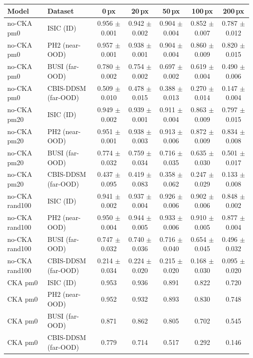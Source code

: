 \begin{tabular}{llccccc}
\toprule
Model & Dataset & 0\,px & 20\,px & 50\,px & 100\,px & 200\,px \\
\midrule
no-CKA pm0 & ISIC (ID) & 0.956 $\pm$ 0.001 & 0.942 $\pm$ 0.002 & 0.904 $\pm$ 0.004 & 0.852 $\pm$ 0.007 & 0.787 $\pm$ 0.012 \\
no-CKA pm0 & PH2 (near-OOD) & 0.957 $\pm$ 0.001 & 0.938 $\pm$ 0.001 & 0.904 $\pm$ 0.004 & 0.860 $\pm$ 0.009 & 0.820 $\pm$ 0.015 \\
no-CKA pm0 & BUSI (far-OOD) & 0.780 $\pm$ 0.002 & 0.754 $\pm$ 0.002 & 0.697 $\pm$ 0.002 & 0.619 $\pm$ 0.004 & 0.490 $\pm$ 0.006 \\
no-CKA pm0 & CBIS-DDSM (far-OOD) & 0.509 $\pm$ 0.010 & 0.478 $\pm$ 0.015 & 0.388 $\pm$ 0.013 & 0.270 $\pm$ 0.014 & 0.147 $\pm$ 0.004 \\
no-CKA pm20 & ISIC (ID) & 0.949 $\pm$ 0.002 & 0.939 $\pm$ 0.001 & 0.911 $\pm$ 0.004 & 0.863 $\pm$ 0.009 & 0.797 $\pm$ 0.015 \\
no-CKA pm20 & PH2 (near-OOD) & 0.951 $\pm$ 0.001 & 0.938 $\pm$ 0.003 & 0.913 $\pm$ 0.006 & 0.872 $\pm$ 0.009 & 0.834 $\pm$ 0.008 \\
no-CKA pm20 & BUSI (far-OOD) & 0.774 $\pm$ 0.032 & 0.759 $\pm$ 0.034 & 0.716 $\pm$ 0.035 & 0.635 $\pm$ 0.030 & 0.501 $\pm$ 0.017 \\
no-CKA pm20 & CBIS-DDSM (far-OOD) & 0.437 $\pm$ 0.095 & 0.419 $\pm$ 0.083 & 0.358 $\pm$ 0.062 & 0.247 $\pm$ 0.029 & 0.133 $\pm$ 0.008 \\
no-CKA rand100 & ISIC (ID) & 0.941 $\pm$ 0.002 & 0.937 $\pm$ 0.004 & 0.926 $\pm$ 0.006 & 0.902 $\pm$ 0.006 & 0.848 $\pm$ 0.002 \\
no-CKA rand100 & PH2 (near-OOD) & 0.950 $\pm$ 0.004 & 0.944 $\pm$ 0.005 & 0.933 $\pm$ 0.006 & 0.910 $\pm$ 0.005 & 0.877 $\pm$ 0.004 \\
no-CKA rand100 & BUSI (far-OOD) & 0.747 $\pm$ 0.032 & 0.740 $\pm$ 0.036 & 0.716 $\pm$ 0.040 & 0.654 $\pm$ 0.045 & 0.496 $\pm$ 0.032 \\
no-CKA rand100 & CBIS-DDSM (far-OOD) & 0.214 $\pm$ 0.034 & 0.224 $\pm$ 0.020 & 0.215 $\pm$ 0.020 & 0.168 $\pm$ 0.030 & 0.095 $\pm$ 0.020 \\
CKA pm0 & ISIC (ID) & 0.953 & 0.936 & 0.891 & 0.822 & 0.720 \\
CKA pm0 & PH2 (near-OOD) & 0.952 & 0.932 & 0.893 & 0.830 & 0.748 \\
CKA pm0 & BUSI (far-OOD) & 0.871 & 0.862 & 0.805 & 0.702 & 0.545 \\
CKA pm0 & CBIS-DDSM (far-OOD) & 0.779 & 0.714 & 0.517 & 0.292 & 0.146 \\

\end{tabular}
